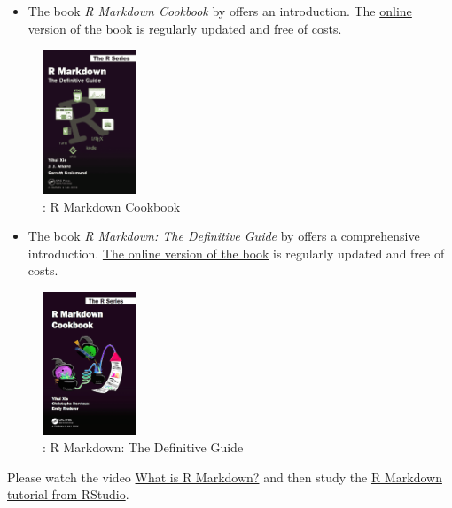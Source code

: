 \documentclass[
  12pt,
  oneside]{book}
\providecommand{\tightlist}{%
  \setlength{\itemsep}{0pt}\setlength{\parskip}{0pt}}
\begin{document}
\begin{itemize}
\tightlist
\item
  The book \emph{R Markdown Cookbook} by \citet{Xie2020R} offers an introduction. The \href{https://bookdown.org/yihui/rmarkdown-cookbook}{online version of the book} is regularly updated and free of costs.
\end{itemize}

\begin{figure}
\centering
\includegraphics[width=0.25\textwidth,height=\textheight]{fig/rmarkdownbook.png}
\caption{\citet{Xie2020R}: R Markdown Cookbook}
\end{figure}

\begin{itemize}
\tightlist
\item
  The book \emph{R Markdown: The Definitive Guide} by \citet{Xie2018R} offers a comprehensive introduction. \href{https://bookdown.org/yihui/rmarkdown}{The online version of the book} is regularly updated and free of costs.
\end{itemize}

\begin{figure}
\centering
\includegraphics[width=0.25\textwidth,height=\textheight]{fig/rmcb.png}
\caption{\citet{Xie2018R}: R Markdown: The Definitive Guide}
\end{figure}

Please watch the video \href{https://vimeo.com/178485416}{What is R Markdown?} and then study the \href{https://rmarkdown.rstudio.com/lesson-1.html}{R Markdown tutorial from RStudio}.
\end{document}
